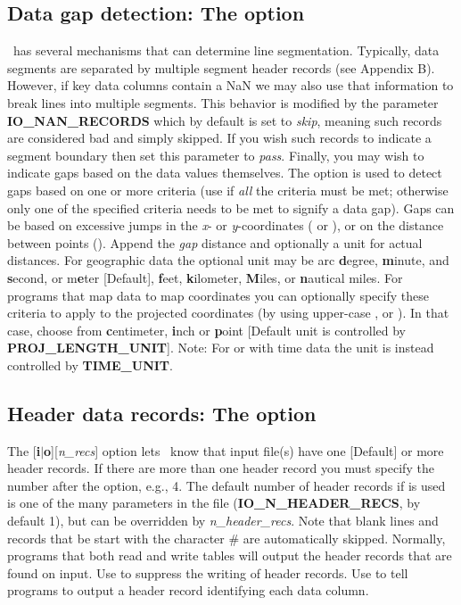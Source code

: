 \subsection{Data gap detection: The  option}
\label{sec:gap}
\GMT\ has several mechanisms that can determine line segmentation.  Typically, data segments are
separated by multiple segment header records (see Appendix B).  However, if key data
columns contain a NaN we may also use that information to break lines into multiple
segments.  This behavior is modified by the parameter \textbf{IO\_NAN\_RECORDS} which
by default is set to \emph{skip}, meaning such records are considered bad and simply
skipped.  If you wish such records to indicate a segment boundary then set this parameter
to \emph{pass}.  Finally, you may wish to indicate gaps based on the data values themselves.
The  option is used to detect gaps based on one or more criteria (use  if
\emph{all} the criteria must be met; otherwise only one of the specified criteria needs
to be met to signify a data gap).  Gaps can be based on excessive jumps in the \emph{x}- or
\emph{y}-coordinates ( or ), or on the distance between points ().
Append the \emph{gap} distance and optionally a unit for actual distances.
For geographic data the optional unit may be arc \textbf{d}egree, \textbf{m}inute, and \textbf{s}econd,
or m\textbf{e}ter [Default], \textbf{f}eet, \textbf{k}ilometer, \textbf{M}iles, or \textbf{n}autical miles.
For programs that map data to map coordinates you can optionally specify these criteria to apply to
the projected coordinates (by using upper-case ,  or ).
In that case, choose from \textbf{c}entimeter, \textbf{i}nch or \textbf{p}oint
[Default unit is controlled by \textbf{PROJ\_LENGTH\_UNIT}].
Note: For  or  with time data the unit is instead controlled by \textbf{TIME\_UNIT}.

\subsection{Header data records: The  option}
\label{sec:header}
The [\textbf{i}$|$\textbf{o}][\emph{n\_recs}] option lets \GMT\ know that input file(s) have
one [Default] or more header records.  If there are more than one header
record you must specify the number after the  option, e.g., 4.  The
default number of header records if  is used is one of the many parameters
in the  file (\textbf{IO\_N\_HEADER\_RECS}, by default 1),
but can be overridden by \emph{n\_header\_recs}.
Note that blank lines and records that be start with the character \# are
automatically skipped.  Normally, programs that both read and write tables will
output the header records that are found on input.  Use  to suppress the
writing of header records.  Use  to tell programs to output a header record
identifying each data column.

